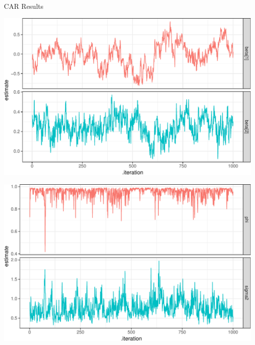\documentclass[11pt,ignorenonframetext,]{beamer}
\begin{document}
\begin{frame}{CAR Results}
\protect\hypertarget{car-results}{}

\begin{center}\includegraphics[width=\textwidth]{Lec19_files/figure-beamer/unnamed-chunk-12-1} \end{center}

\end{frame}

\begin{frame}{}
\protect\hypertarget{section-1}{}

\begin{center}\includegraphics[width=\textwidth]{Lec19_files/figure-beamer/unnamed-chunk-13-1} \end{center}

\end{frame}
\end{document}
